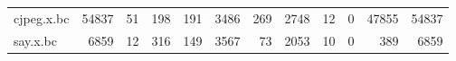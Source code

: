 \begin{table}[ht]
\begin{adjustbox}{width=1.3\textwidth}
\begin{tabular}{lrrrrrrrrrrr}
 cjpeg.x.bc           &               54837 &                   51 &                        198 &                  191 &                     3486 &                                269 &                          2748 &                  12 &                                         0 &                                       47855 &                54837 \\
 say.x.bc             &                6859 &                   12 &                        316 &                  149 &                     3567 &                                 73 &                          2053 &                  10 &                                         0 &                                         389 &                 6859 \\
\hline
\end{tabular}
\end{adjustbox}
\end{table}
